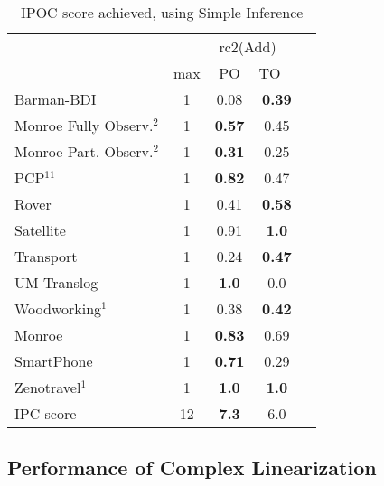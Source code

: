\documentclass[letterpaper]{article} %
\begin{document}
\begin{table*}[h]
	\centering
	\caption{IPOC score achieved, using Simple Inference}
	\scalebox{1} {
\begin{tabular}{lccccl} 
	\toprule 
	&& \multicolumn{2}{c}{rc2(Add)} \\
	\cmidrule(lr){3-4}  
	& max &PO &  TO   \\ 
	\midrule 
	Barman-BDI & 1 & 0.08 &\multicolumn{2}{c}{ \textbf{0.39}  } \\ 
	Monroe Fully Observ.$^{2}$ & 1 & \textbf{0.57} &\multicolumn{2}{c}{ 0.45  } \\ 
	Monroe Part. Observ.$^{2}$ & 1 & \textbf{0.31} &\multicolumn{2}{c}{ 0.25  } \\ 
	PCP$^{11}$ & 1 & \textbf{0.82} &\multicolumn{2}{c}{ 0.47  } \\ 
	Rover & 1 & 0.41 &\multicolumn{2}{c}{ \textbf{0.58}  } \\ 
	Satellite & 1 & 0.91 &\multicolumn{2}{c}{ \textbf{1.0}  } \\ 
	Transport & 1 & 0.24 &\multicolumn{2}{c}{ \textbf{0.47}  } \\ 
	UM-Translog & 1 & \textbf{1.0} &\multicolumn{2}{c}{ 0.0  } \\ 
	Woodworking$^{1}$ & 1 & 0.38 &\multicolumn{2}{c}{ \textbf{0.42}  } \\ 
	\midrule 
	Monroe & 1 & \textbf{0.83} &\multicolumn{2}{c}{ 0.69  } \\ 
	SmartPhone & 1 & \textbf{0.71} &\multicolumn{2}{c}{ 0.29  } \\ 
	Zenotravel$^{1}$ & 1 & \textbf{1.0} &\multicolumn{2}{c}{ \textbf{1.0}  } \\ 
	\midrule 
	IPC score & 12 & \textbf{7.3} &\multicolumn{2}{c}{ 6.0  } \\ 
	\bottomrule 
\end{tabular} 

	}
\end{table*}


\subsection{Performance of Complex Linearization}
\end{document}
